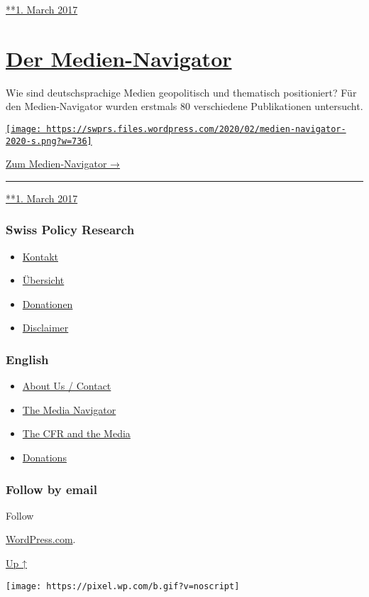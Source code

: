 \href{https://swprs.org/2017/03/01/zensur-in-schweizer-medien/}{**1.
March 2017}

\hypertarget{der-medien-navigator}{%
\section{\texorpdfstring{\href{https://swprs.org/2017/03/01/der-medien-navigator/}{Der
Medien-Navigator}}{Der Medien-Navigator}}\label{der-medien-navigator}}

Wie sind deutsch­spra­chige Medien geo­po­li­tisch und the­matisch
posi­tio­niert? Für den Medien-Navi­gator wurden erst­mals 80
verschiedene Publi­ka­tionen unter­sucht.

\href{https://swprs.org/medien-navigator/}{\texttt{[image: https://swprs.files.wordpress.com/2020/02/medien-navigator-2020-s.png?w=736]}}

\href{https://swprs.org/medien-navigator/}{Zum Medien-Navigator →}

\begin{center}\rule{0.5\linewidth}{\linethickness}\end{center}

\href{https://swprs.org/2017/03/01/der-medien-navigator/}{**1. March
2017}

\hypertarget{swiss-policy-research}{%
\subsubsection{Swiss Policy Research}\label{swiss-policy-research}}

\begin{itemize}
\tightlist
\item
  \href{https://swprs.org/kontakt/}{Kontakt}
\item
  \href{https://swprs.org/uebersicht/}{Übersicht}
\item
  \href{https://swprs.org/donationen/}{Donationen}
\item
  \href{https://swprs.org/disclaimer/}{Disclaimer}
\end{itemize}

\hypertarget{english}{%
\subsubsection{English}\label{english}}

\begin{itemize}
\tightlist
\item
  \href{https://swprs.org/contact/}{About Us / Contact}
\item
  \href{https://swprs.org/media-navigator/}{The Media Navigator}
\item
  \href{https://swprs.org/the-american-empire-and-its-media/}{The CFR
  and the Media}
\item
  \href{https://swprs.org/donations/}{Donations}
\end{itemize}

\hypertarget{follow-by-email}{%
\subsubsection{Follow by email}\label{follow-by-email}}

Follow

\href{https://wordpress.com/?ref=footer_custom_com}{WordPress.com}.

\protect\hyperlink{}{Up ↑}

\texttt{[image: https://pixel.wp.com/b.gif?v=noscript]}

